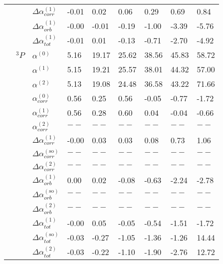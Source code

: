 \begin{longtable}{lllllllll}
      &       & $\Delta \alpha_{corr}^{(\text{1})}$ &        -0.01 &          0.02 &          0.06 &        0.29 &        0.69 &  0.84 \\
      &       & $\Delta \alpha_{orb}^{(\text{1})}$ &        -0.00 &         -0.01 &         -0.19 &       -1.00 &       -3.39 & -5.76 \\
      &       & $\Delta \alpha_{tot}^{(\text{1})}$ &        -0.01 &          0.01 &         -0.13 &       -0.71 &       -2.70 & -4.92 \\
      & $^3P$ & $\alpha^{(0)}$ &         5.16 &         19.17 &         25.62 &       38.56 &       45.83 & 58.72 \\
      &       & $\alpha^{(1)}$ &         5.15 &         19.21 &         25.57 &       38.01 &       44.32 & 57.00 \\
      &       & $\alpha^{(2)}$ &         5.13 &         19.08 &         24.48 &       36.58 &       43.22 & 71.66 \\
      &       & $\alpha_{corr}^{(0)}$ &         0.56 &          0.25 &          0.56 &       -0.05 &       -0.77 & -1.72 \\
      &       & $\alpha_{corr}^{(1)}$ &         0.56 &          0.28 &          0.60 &        0.04 &       -0.04 & -0.66 \\
      &       & $\alpha_{corr}^{(2)}$ &          $--$ &           $--$ &           $--$ &         $--$ &         $--$ &   $--$ \\
      &       & $\Delta \alpha_{corr}^{(\text{1})}$ &        -0.00 &          0.03 &          0.03 &        0.08 &        0.73 &  1.06 \\
      &       & $\Delta \alpha_{corr}^{(\text{so})}$ &          $--$ &           $--$ &           $--$ &         $--$ &         $--$ &   $--$ \\
      &       & $\Delta \alpha_{corr}^{(\text{2})}$ &          $--$ &           $--$ &           $--$ &         $--$ &         $--$ &   $--$ \\
      &       & $\Delta \alpha_{orb}^{(\text{1})}$ &         0.00 &          0.02 &         -0.08 &       -0.63 &       -2.24 & -2.78 \\
      &       & $\Delta \alpha_{orb}^{(\text{so})}$ &          $--$ &           $--$ &           $--$ &         $--$ &         $--$ &   $--$ \\
      &       & $\Delta \alpha_{orb}^{(\text{2})}$ &          $--$ &           $--$ &           $--$ &         $--$ &         $--$ &   $--$ \\
      &       & $\Delta \alpha_{tot}^{(\text{1})}$ &        -0.00 &          0.05 &         -0.05 &       -0.54 &       -1.51 & -1.72 \\
      &       & $\Delta \alpha_{tot}^{(\text{so})}$ &        -0.03 &         -0.27 &         -1.05 &       -1.36 &       -1.26 & 14.44 \\
      &       & $\Delta \alpha_{tot}^{(\text{2})}$ &        -0.03 &         -0.22 &         -1.10 &       -1.90 &       -2.76 & 12.72 \\
\end{longtable}
